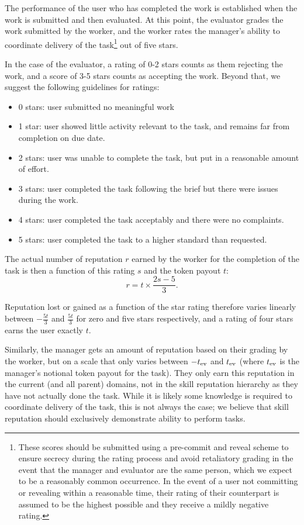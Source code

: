 The performance of the user who has completed the work is established when the work is submitted and then evaluated. At this point, the evaluator grades the work submitted by the worker, and the worker rates the manager's ability to coordinate delivery of the task\footnote{These scores should be submitted using a pre-commit and reveal scheme to ensure secrecy during the rating process and avoid retaliatory grading in the event that the manager and evaluator are the same person, which we expect to be a reasonably common occurrence. In the event of a user not committing or revealing within a reasonable time, their rating of their counterpart is assumed to be the highest possible and they receive a mildly negative rating. } out of five stars.

In the case of the evaluator, a rating of 0-2 stars counts as them rejecting the work, and a score of 3-5 stars counts as accepting the work. Beyond that, we suggest the following guidelines for ratings:
\begin{itemize}
 \item[] 0 stars: user submitted no meaningful work 
 \item[]1 star:\phantom{s} user showed little activity relevant to the task, and remains far from completion on due date.
 \item[]2 stars: user was unable to complete the task, but put in a reasonable amount of effort.
 \item[]3 stars: user completed the task following the brief but there were issues during the work.
 \item[]4 stars: user completed the task acceptably and there were no complaints.
 \item[]5 stars: user completed the task to a higher standard than requested.
\end{itemize}

The actual number of reputation $r$ earned by the worker for the completion of the task is then a function of this rating $s$ and the token payout $t$:
\begin{equation*}\label{eq:stars-to-rep}
 r = t \times \frac{2s - 5}{3}.
\end{equation*}
 
Reputation lost or gained as a function of the star rating therefore varies linearly between $-\frac{5t}{3}$ and $\frac{5t}{3}$ for zero and five stars respectively, and a rating of four stars earns the user exactly $t$. 

Similarly, the manager gets an amount of reputation based on their grading by the worker, but on a scale that only varies between $-t_{\rm ev}$ and $t_{\rm ev}$ (where $t_{\rm ev}$ is the manager's notional token payout for the task). They only earn this reputation in the current (and all parent) domains, not in the skill reputation hierarchy as they have not actually done the task. While it is likely some knowledge is required to coordinate delivery of the task, this is not always the case; we believe that skill reputation should exclusively demonstrate ability to perform tasks.

